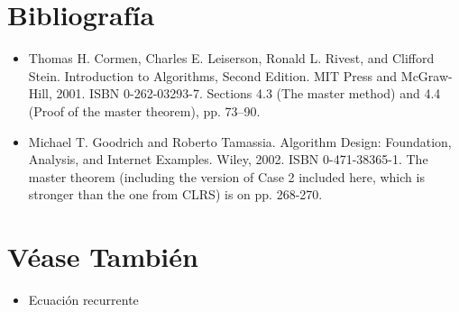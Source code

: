 \documentclass[12pt]{article} %
\begin{document}
\section{Bibliografía}
\begin{itemize}
\item Thomas H. Cormen, Charles E. Leiserson, Ronald L. Rivest, and Clifford Stein. Introduction to Algorithms, Second Edition. MIT Press and McGraw-Hill, 2001. ISBN 0-262-03293-7. Sections 4.3 (The master method) and 4.4 (Proof of the master theorem), pp. 73–90.

\item Michael T. Goodrich and Roberto Tamassia. Algorithm Design: Foundation, Analysis, and Internet Examples. Wiley, 2002. ISBN 0-471-38365-1. The master theorem (including the version of Case 2 included here, which is stronger than the one from CLRS) is on pp. 268-270.
\end{itemize}

\section{Véase También}
\begin{itemize}
\item Ecuación recurrente
\end{itemize}

\printbibliography[title={}]
\end{document}

